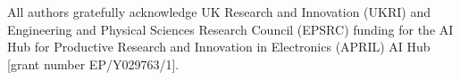 \documentclass[sigplan,screen]{acmart}
\begin{document}

\setcounter{topnumber}{5}
\setcounter{totalnumber}{10}
\renewcommand{\topfraction}{0.95}
\renewcommand{\textfraction}{0.05}

\setlength{\textfloatsep}{6pt}
\setlength{\floatsep}{6pt}
\setlength{\intextsep}{6pt}

\maketitle











\begin{acks}


All authors gratefully acknowledge UK Research and Innovation (UKRI) and Engineering and Physical Sciences Research Council (EPSRC) funding for the AI Hub for Productive Research and Innovation in Electronics (APRIL) AI Hub [grant number EP/Y029763/1].
\end{acks}
\end{document}
